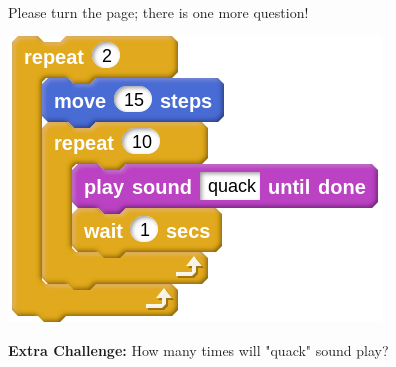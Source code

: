 \documentclass[letterpaper,12pt]{article}
\newcommand\numbox{%
    \fbox{\rule{1in}{0pt}\rule[-1ex]{0pt}{5ex}}}
\begin{document}
\noindent \dotfill \\
Please turn the page; there is one more question!
\newpage

\begin{center}
\includegraphics[scale=.4]{ec_script0.png}
\end{center}

\noindent \textbf{Extra Challenge:} How many times will "quack" sound play? \numbox
\end{document}
